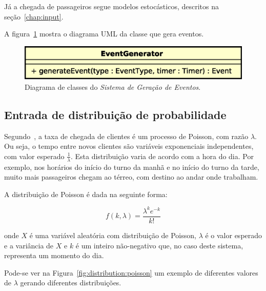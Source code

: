 Já a chegada de passageiros segue modelos estocásticos, descritos na seção~\ref{chap:input}.

A figura~\ref{fig:diagram:generator} mostra o diagrama UML da classe que gera eventos.

\begin{figure}[htb!]
  \centering
  \includegraphics[scale=0.6]{img/EventGenerator.eps}
  \caption{Diagrama de classes do \textit{Sistema de Geração de Eventos}.}
\label{fig:diagram:generator}
\end{figure}

\subsection{\label{chap:input}Entrada de distribuição de probabilidade}

Segundo~\cite{Ross:2006:IPM:1197141}, a taxa de chegada de clientes é um
processo de Poisson, com razão $\lambda$. Ou seja, o tempo entre novos clientes
são variáveis exponenciais independentes, com valor esperado
$\frac{1}{\lambda}$. Esta distribuição varia de acordo com a hora do dia. Por
exemplo, nos horários do início do turno da manhã e no início do turno da tarde,
muito mais passageiros chegam ao térreo, com destino ao andar onde trabalham.

A distribuição de Poisson é dada na seguinte forma:

\[f(k,\lambda) = \frac{\lambda^{k}e^{-k}}{k!}\]

onde $X$ é uma variável aleatória com distribuição de Poisson, $\lambda$ é o
valor esperado e a variância de $X$ e $k$ é um inteiro não-negativo que, no caso
deste sistema, representa um momento do dia.

Pode-se ver na Figura~\ref{fig:distribution:poisson} um exemplo de diferentes
valores de $\lambda$ gerando diferentes distribuições.

